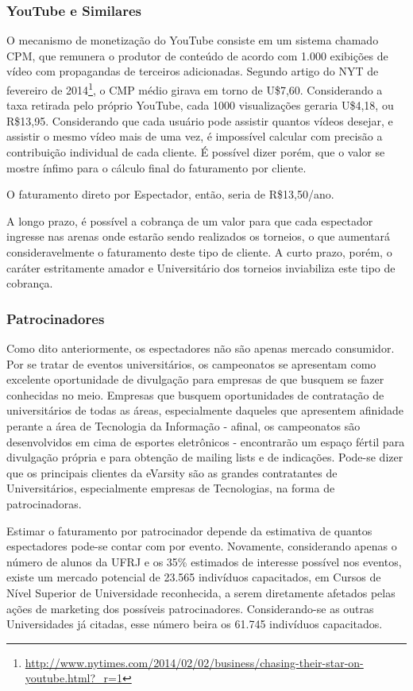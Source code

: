\documentclass[a4paper, 12pt]{paper}
\begin{document}
\subsubsection{YouTube e Similares}
O mecanismo de monetização do YouTube consiste em um sistema chamado CPM, que remunera o produtor de conteúdo de acordo com 1.000 exibições de vídeo com propagandas de terceiros adicionadas. Segundo artigo do NYT de fevereiro de 2014\footnote{\url{http://www.nytimes.com/2014/02/02/business/chasing-their-star-on-youtube.html?_r=1}}, o CMP médio girava em torno de U\$7,60. Considerando a taxa retirada pelo próprio YouTube, cada 1000 visualizações geraria U\$4,18, ou  R\$13,95. Considerando que cada usuário pode assistir quantos vídeos desejar, e assistir o mesmo vídeo mais de uma vez, é impossível calcular com precisão a contribuição individual de cada cliente. É possível dizer porém, que o valor se mostre ínfimo para o cálculo final do faturamento por cliente.

O faturamento direto por Espectador, então, seria de R\$13,50/ano.

A longo prazo, é possível a cobrança de um valor para que cada espectador ingresse nas arenas onde estarão sendo realizados os torneios, o que aumentará consideravelmente o faturamento deste tipo de cliente. A curto prazo, porém, o caráter estritamente amador e Universitário dos torneios inviabiliza este tipo de cobrança.

\subsubsection{Patrocinadores}
Como dito anteriormente, os espectadores não são apenas mercado consumidor. Por se tratar de eventos universitários, os campeonatos se apresentam como excelente oportunidade de divulgação para empresas de que busquem se fazer conhecidas no meio. Empresas que busquem oportunidades de contratação de universitários de todas as áreas, especialmente daqueles que apresentem afinidade perante a área de Tecnologia da Informação - afinal, os campeonatos são desenvolvidos em cima de esportes eletrônicos - encontrarão um espaço fértil para divulgação própria e para obtenção de mailing lists e de indicações. Pode-se dizer que os principais clientes da eVarsity são as grandes contratantes de Universitários, especialmente empresas de Tecnologias, na forma de patrocinadoras.

Estimar o faturamento por patrocinador depende da estimativa de quantos espectadores pode-se contar com por evento. Novamente, considerando apenas o número de alunos da UFRJ e os 35\% estimados de interesse possível nos eventos, existe um mercado potencial de 23.565 indivíduos capacitados, em Cursos de Nível Superior de Universidade reconhecida, a serem diretamente afetados pelas ações de marketing dos possíveis patrocinadores. Considerando-se as outras Universidades já citadas, esse número beira os 61.745 indivíduos capacitados.
\end{document}
